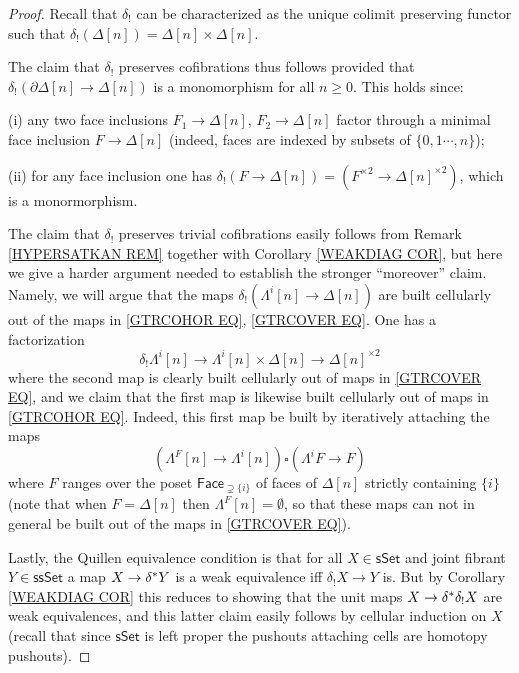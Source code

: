 \documentclass[a4paper,10pt,draft]{article}%
\begin{document}
\begin{proof}
	Recall that $\delta_!$ can be characterized as the unique colimit preserving functor such that 
	$\delta_!(\Delta[n])=\Delta[n] \times \Delta[n]$.

	The claim that $\delta_!$ preserves cofibrations thus follows provided that 
	$\delta_{!}\left( \partial \Delta[n] \to \Delta[n]\right)$
	is a monomorphism for all $n\geq 0$.
	This holds since:
	\begin{inparaenum}
		\item[(i)] any two face inclusions $F_1 \to \Delta[n]$, $F_2 \to \Delta[n]$ factor through a minimal face inclusion $F \to \Delta[n]$ (indeed, faces are indexed by subsets of $\{0,1\cdots,n\}$); 
		\item[(ii)] for any face inclusion one has 
		$\delta_{!}\left( F \to \Delta[n]\right) = 
		\left(F^{\times 2} \to \Delta[n]^{\times 2} \right)$, which is a monormorphism.
	\end{inparaenum}

The claim that $\delta_!$ preserves trivial cofibrations easily follows from Remark \ref{HYPERSATKAN REM} together with Corollary \ref{WEAKDIAG COR}, but here we give a harder argument needed to establish the stronger ``moreover'' claim.
Namely, we will argue that the maps
$\delta_! \left( \Lambda^i[n] \to \Delta[n]\right)$
are built cellularly out of the maps in 
\eqref{GTRCOHOR EQ}, \eqref{GTRCOVER EQ}.
One has a factorization
\[
	\delta_! \Lambda^i[n] \to
	\Lambda^i[n] \times \Delta[n] \to \Delta[n]^{\times 2}
\]
where the second map is clearly built cellularly out of maps in 
\eqref{GTRCOVER EQ}, and we claim that 
the first map is likewise built cellularly out of maps in \eqref{GTRCOHOR EQ}.
Indeed, this first map be built by iteratively attaching the maps
\[
	\left(\Lambda^{F}[n] \to \Lambda^i[n] \right)
		\square
	\left(\Lambda^{i}F \to F \right)
\]
where $F$ ranges over the poset $\mathsf{Face}_{\supsetneq \{i\}}$
of faces of $\Delta[n]$ strictly containing $\{i\}$ 
(note that when $F=\Delta[n]$ then $\Lambda^F[n]=\emptyset$, so that these maps can not in general be built out of the maps in \eqref{GTRCOVER EQ}). 

Lastly, the Quillen equivalence condition 
is that for all $X \in \mathsf{sSet}$ and joint fibrant
$Y \in \mathsf{ssSet}$ a map
$X \to \delta^{\**} Y$ is a weak equivalence iff 
$\delta_!X \to Y$ is. 
But by Corollary \ref{WEAKDIAG COR}
this reduces to showing
that the unit maps $X \to \delta^{\**} \delta_! X$
are weak equivalences, and this latter claim easily follows by cellular induction on $X$
(recall that since $\mathsf{sSet}$ is left proper the pushouts attaching cells are homotopy pushouts).
\end{proof}
\end{document}

